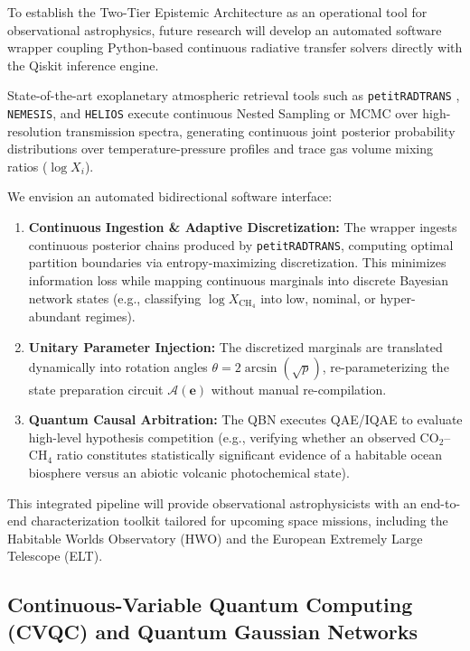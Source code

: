 To establish the Two-Tier Epistemic Architecture as an operational tool for observational astrophysics, future research will develop an automated software wrapper coupling Python-based continuous radiative transfer solvers directly with the Qiskit inference engine.

State-of-the-art exoplanetary atmospheric retrieval tools such as \texttt{petitRADTRANS} \cite{molliere2019}, \texttt{NEMESIS}, and \texttt{HELIOS} execute continuous Nested Sampling or MCMC over high-resolution transmission spectra, generating continuous joint posterior probability distributions over temperature-pressure profiles and trace gas volume mixing ratios ($\log X_i$).

We envision an automated bidirectional software interface:
\begin{enumerate}
    \item \textbf{Continuous Ingestion \& Adaptive Discretization:} The wrapper ingests continuous posterior chains produced by \texttt{petitRADTRANS}, computing optimal partition boundaries via entropy-maximizing discretization. This minimizes information loss while mapping continuous marginals into discrete Bayesian network states (e.g., classifying $\log X_{\mathrm{CH}_4}$ into low, nominal, or hyper-abundant regimes).
    \item \textbf{Unitary Parameter Injection:} The discretized marginals are translated dynamically into rotation angles $\theta = 2 \arcsin(\sqrt{p})$, re-parameterizing the state preparation circuit $\mathcal{A}(\mathbf{e})$ without manual re-compilation.
    \item \textbf{Quantum Causal Arbitration:} The QBN executes QAE/IQAE to evaluate high-level hypothesis competition (e.g., verifying whether an observed $\mathrm{CO}_2$--$\mathrm{CH}_4$ ratio constitutes statistically significant evidence of a habitable ocean biosphere versus an abiotic volcanic photochemical state).
\end{enumerate}
This integrated pipeline will provide observational astrophysicists with an end-to-end characterization toolkit tailored for upcoming space missions, including the Habitable Worlds Observatory (HWO) and the European Extremely Large Telescope (ELT).

\subsection{Continuous-Variable Quantum Computing (CVQC) and Quantum Gaussian Networks}\label{subsec:future_cvqc}

